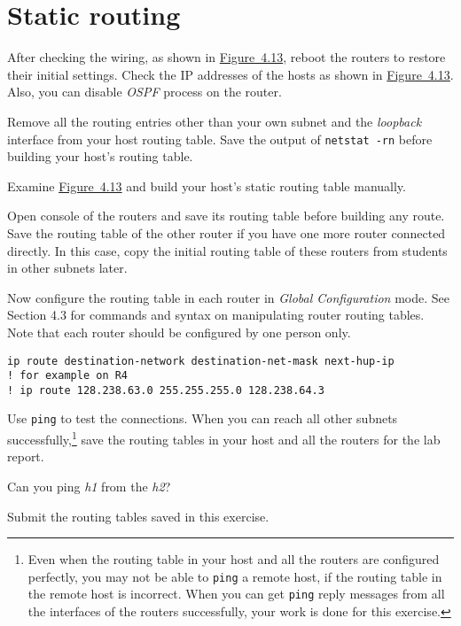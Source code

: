 \documentclass{../UTNetLab}
\begin{document}
\section{Static routing}
    After checking the wiring, as shown in \hyperref[fig:4.13]{Figure~4.13}, reboot the routers to restore their initial settings.
    Check the IP addresses of the hosts as shown in \hyperref[fig:4.13]{Figure~4.13}.
    Also, you can disable \textit{OSPF} process on the router.

    Remove all the routing entries other than your own subnet and the \textit{loopback} interface from your host routing table.
    Save the output of \lstinline{netstat -rn} before building your host’s routing table.

    Examine \hyperref[fig:4.13]{Figure~4.13} and build your host’s static routing table manually.

    Open console of the routers and save its routing table before building any route.
    Save the routing table of the other router if you have one more router connected directly.
    In this case, copy the initial routing table of these routers from students in other subnets later.

    Now configure the routing table in each router in \textit{Global Configuration} mode.
    See Section 4.3 for commands and syntax on manipulating router routing tables.
    Note that each router should be configured by one person only.

    \begin{lstlisting}[language={cisco}, emph={destination-network, destination-net-mask, next-hup-ip}]
ip route destination-network destination-net-mask next-hup-ip
! for example on R4
! ip route 128.238.63.0 255.255.255.0 128.238.64.3
    \end{lstlisting}

    Use \lstinline{ping} to test the connections.
    When you can reach all other subnets successfully,\footnote{Even when the routing table in your host and all the routers are configured perfectly, you may not be able to \lstinline{ping} a remote host, if the routing table in the remote host is incorrect.
    When you can get \lstinline{ping} reply messages from all the interfaces of the routers successfully, your work is done for this exercise.} save the routing tables in your host and all the routers for the lab report.
    
    \begin{report}
        \item Can you ping \textit{h1} from the \textit{h2}?
        
        \item Submit the routing tables saved in this exercise.
    \end{report}
\end{document}
